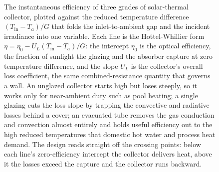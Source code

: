 \begin{figure}[htbp]
\centering
{}
\caption[Flat-plate solar-collector efficiency curve]{The instantaneous
efficiency of three grades of solar-thermal collector, plotted against the
reduced temperature difference $(T_{\text{in}} - T_a)/G$ that folds the
inlet-to-ambient gap and the incident irradiance into one variable. Each
line is the Hottel-Whillier form $\eta = \eta_0 - U_L (T_{\text{in}} -
T_a)/G$: the intercept $\eta_0$ is the optical efficiency, the fraction of
sunlight the glazing and the absorber capture at zero temperature
difference, and the slope $U_L$ is the collector's overall loss
coefficient, the same combined-resistance quantity that governs a wall.
An unglazed collector starts high but loses steeply, so it works only for
near-ambient duty such as pool heating; a single glazing cuts the loss
slope by trapping the convective and radiative losses behind a cover; an
evacuated tube removes the gas conduction and convection almost entirely
and holds useful efficiency out to the high reduced temperatures that
domestic hot water and process heat demand. The design reads straight off
the crossing points: below each line's zero-efficiency intercept the
collector delivers heat, above it the losses exceed the capture and the
collector runs backward.}
\label{fig:vol04ch05:collector-efficiency}
\end{figure}
